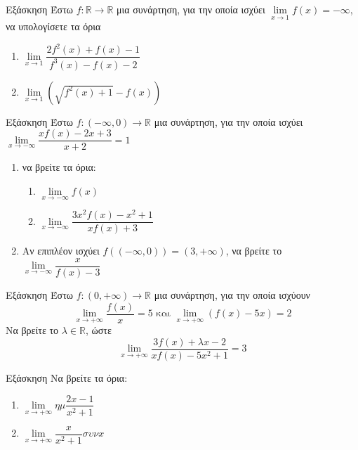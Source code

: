\documentclass{presentation}
\begin{document}
\begin{frame}{Εξάσκηση}
      Έστω $f:\mathbb{R}\to\mathbb{R}$ μια συνάρτηση, για την οποία ισχύει $\lim\limits_{x \to 1}{ f(x)  }=-\infty$, να υπολογίσετε τα όρια
      \begin{enumerate}
            \item $\lim\limits_{x \to 1}{ \dfrac{2f^2(x)+f(x)-1}{f^3(x)-f(x)-2} }$ \pause
            \item $\lim\limits_{x \to 1}{ \left( \sqrt{f^2(x)+1}-f(x) \right)  }$
      \end{enumerate}
\end{frame}

\begin{frame}{Εξάσκηση}
      Έστω $f:(-\infty,0)\to\mathbb{R}$ μια συνάρτηση, για την οποία ισχύει $\lim\limits_{x \to -\infty}{ \dfrac{xf(x)-2x+3}{x+2}  }=1$
      \begin{enumerate}
            \item να βρείτε τα όρια:
                  \begin{enumerate}
                        \item $\lim\limits_{x \to -\infty}{ f(x) }$ \pause
                        \item $\lim\limits_{x \to -\infty}{ \dfrac{3x^2f(x)-x^2+1}{xf(x)+3}  }$
                  \end{enumerate}
            \item Αν επιπλέον ισχύει $f\left( (-\infty,0) \right)=(3,+\infty) $, να βρείτε το $\lim\limits_{x \to -\infty}{ \dfrac{x}{f(x)-3} }$
      \end{enumerate}
\end{frame}

\begin{frame}{Εξάσκηση}
      Έστω $f:(0,+\infty)\to\mathbb{R}$ μια συνάρτηση, για την οποία ισχύουν
      $$\lim\limits_{x \to +\infty}{ \dfrac{f(x)}{x} }=5 \text{ και } \lim\limits_{x \to +\infty}{ (f(x)-5x) }=2$$
      Να βρείτε το $λ\in\mathbb{R}$, ώστε
      $$\lim\limits_{x \to +\infty}{ \dfrac{3f(x)+λx-2}{xf(x)-5x^2+1} }=3$$
\end{frame}

\begin{frame}{Εξάσκηση}
      Να βρείτε τα όρια:
      \begin{enumerate}
            \item $\lim\limits_{x \to +\infty}{ ημ\dfrac{2x-1}{x^2+1} }$ \pause
            \item $\lim\limits_{x \to +\infty}{ \dfrac{x}{x^2+1}συνx  }$
      \end{enumerate}
\end{frame}
\end{document}
